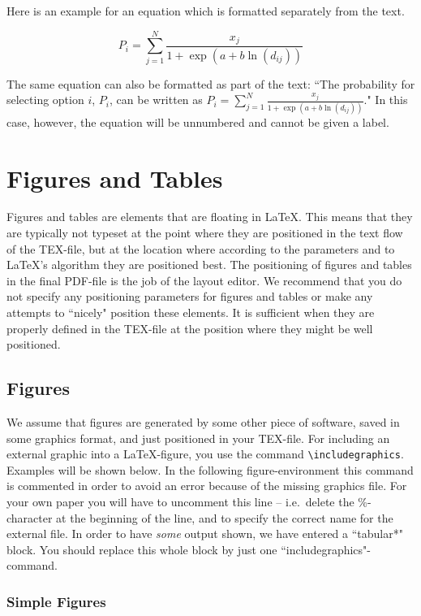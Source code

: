 \documentclass[a4paper,twoside]{article}
\begin{document}
Here is an example for an equation which is formatted separately from the text. 

\begin{equation}
P_i = \sum_{j=1}^N \frac{x_j}{1 + \exp(a+b\ln(d_{ij}))} 
\label{eq:1}
\end{equation}

The same equation can also be formatted as part of the text: ``The probability for selecting option $i$, $P_i$, can be written as $P_i = \sum_{j=1}^N \frac{x_j}{1 + \exp(a+b\ln(d_{ij}))}$." In this case, however, the equation will be unnumbered and cannot be given a label.


\section{Figures and Tables}
\label{sec:4}

Figures and tables are elements that are floating in \LaTeX. This means that they are typically not typeset at the point where they are positioned in the text flow of the TEX-file, but at the location where according to the parameters and to \LaTeX's algorithm they are positioned best. The positioning of figures and tables in the final PDF-file is the job of the layout editor. We recommend that you do not specify any positioning parameters for figures and tables or make any attempts to ``nicely" position these elements. It is sufficient when they are properly defined in the TEX-file at the position where they might be well positioned.

\subsection{Figures}
\label{sec:4.1}


We assume that figures are generated by some other piece of software, saved in some graphics format, and just positioned in your TEX-file. For including an external graphic into a \LaTeX-figure, you use the command \verb|\includegraphics|. Examples will be shown below. In the following figure-environment this command is commented in order to avoid an error because of the missing graphics file. For your own paper you will have to uncomment this line -- i.e.\ delete the \%-character at the beginning of the line, and to specify the correct name for the external file. In order to have \emph{some} output shown, we have entered a ``tabular*" block. You should replace this whole block by just one ``includegraphics"-command.

\subsubsection{Simple Figures}
\label{sec:4.1.1}
\end{document}
